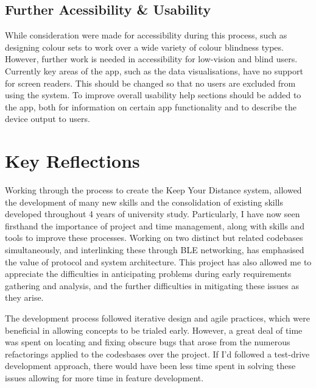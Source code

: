 \documentclass{l4proj}
\begin{document}
\subsection{Further Acessibility \& Usability}

While consideration were made for accessibility during this process, such as designing colour sets to work over a wide variety of colour blindness types. However, further work is needed in accessibility for low-vision and blind users. Currently key areas of the app, such as the data visualisations, have no support for screen readers. This should be changed so that no users are excluded from using the system. To improve overall usability help sections should be added to the app, both for information on certain app functionality and to describe the device output to users.

\section{Key Reflections}

Working through the process to create the Keep Your Distance system, allowed the development of many new skills and the consolidation of existing skills developed throughout 4 years of university study. Particularly, I have now seen firsthand the importance of project and time management, along with skills and tools to improve these processes. Working on two distinct but related codebases simultaneously, and interlinking these through BLE networking, has emphasised the value of protocol and system architecture. This project has also allowed me to appreciate the difficulties in anticipating problems during early requirements gathering and analysis, and the further difficulties in mitigating these issues as they arise.

The development process followed iterative design and agile practices, which were beneficial in allowing concepts to be trialed early. However, a great deal of time was spent on locating and fixing obscure bugs that arose from the numerous refactorings applied to the codesbases over the project. If I'd followed a test-drive development approach, there would have been less time spent in solving these issues allowing for more time in feature development.

%
% 
\end{document}
